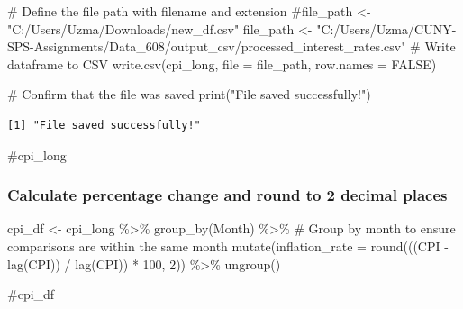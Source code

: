 \documentclass[
  letterpaper,
  DIV=11,
  numbers=noendperiod]{scrartcl}
\newenvironment{Shaded}{\begin{snugshade}}{\end{snugshade}}
\newcommand{\AttributeTok}[1]{\textcolor[rgb]{0.40,0.45,0.13}{#1}}
\newcommand{\CommentTok}[1]{\textcolor[rgb]{0.37,0.37,0.37}{#1}}
\newcommand{\ConstantTok}[1]{\textcolor[rgb]{0.56,0.35,0.01}{#1}}
\newcommand{\DecValTok}[1]{\textcolor[rgb]{0.68,0.00,0.00}{#1}}
\newcommand{\FunctionTok}[1]{\textcolor[rgb]{0.28,0.35,0.67}{#1}}
\newcommand{\NormalTok}[1]{\textcolor[rgb]{0.00,0.23,0.31}{#1}}
\newcommand{\OtherTok}[1]{\textcolor[rgb]{0.00,0.23,0.31}{#1}}
\newcommand{\SpecialCharTok}[1]{\textcolor[rgb]{0.37,0.37,0.37}{#1}}
\newcommand{\StringTok}[1]{\textcolor[rgb]{0.13,0.47,0.30}{#1}}
\begin{document}
\begin{Shaded}
\begin{Highlighting}[]
\CommentTok{\# Define the file path with filename and extension}
\CommentTok{\#file\_path \textless{}{-} "C:/Users/Uzma/Downloads/new\_df.csv"}
\NormalTok{file\_path }\OtherTok{\textless{}{-}} \StringTok{"C:/Users/Uzma/CUNY{-}SPS{-}Assignments/Data\_608/output\_csv/processed\_interest\_rates.csv"}
\CommentTok{\# Write dataframe to CSV}
\FunctionTok{write.csv}\NormalTok{(cpi\_long, }\AttributeTok{file =}\NormalTok{ file\_path, }\AttributeTok{row.names =} \ConstantTok{FALSE}\NormalTok{)}

\CommentTok{\# Confirm that the file was saved}
\FunctionTok{print}\NormalTok{(}\StringTok{"File saved successfully!"}\NormalTok{)}
\end{Highlighting}
\end{Shaded}

\begin{verbatim}
[1] "File saved successfully!"
\end{verbatim}

\begin{Shaded}
\begin{Highlighting}[]
\CommentTok{\#cpi\_long}
\end{Highlighting}
\end{Shaded}

\subsubsection{Calculate percentage change and round to 2 decimal
places}\label{calculate-percentage-change-and-round-to-2-decimal-places}

\begin{Shaded}
\begin{Highlighting}[]
\NormalTok{cpi\_df }\OtherTok{\textless{}{-}}\NormalTok{ cpi\_long }\SpecialCharTok{\%\textgreater{}\%}
  \FunctionTok{group\_by}\NormalTok{(Month) }\SpecialCharTok{\%\textgreater{}\%}  \CommentTok{\# Group by month to ensure comparisons are within the same month}
  \FunctionTok{mutate}\NormalTok{(}\StringTok{\textasciigrave{}}\AttributeTok{inflation\_rate}\StringTok{\textasciigrave{}} \OtherTok{=} \FunctionTok{round}\NormalTok{(((CPI }\SpecialCharTok{{-}} \FunctionTok{lag}\NormalTok{(CPI)) }\SpecialCharTok{/} \FunctionTok{lag}\NormalTok{(CPI)) }\SpecialCharTok{*} \DecValTok{100}\NormalTok{, }\DecValTok{2}\NormalTok{)) }\SpecialCharTok{\%\textgreater{}\%}
  \FunctionTok{ungroup}\NormalTok{()}

\CommentTok{\#cpi\_df}
\end{Highlighting}
\end{Shaded}
\end{document}
